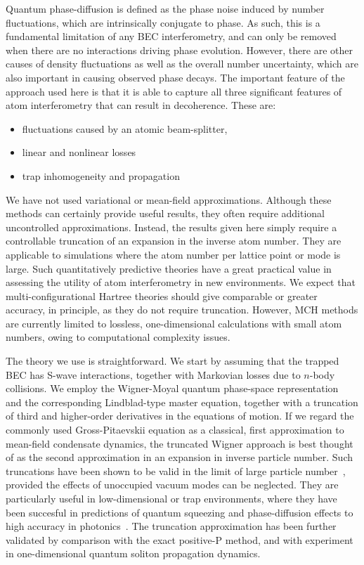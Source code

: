 \documentclass[aps,prl,twocolumn,showpacs,amsmath,amssymb,superscriptaddress]{revtex4-1}
\begin{document}
Quantum phase-diffusion is defined as the phase noise induced by number fluctuations,
which are intrinsically conjugate to phase.
As such, this is a fundamental limitation of any BEC interferometry,
and can only be removed when there are no interactions driving phase evolution.
However, there are other causes of density fluctuations as well as the overall number uncertainty,
which are also important in causing observed phase decays.
The important feature of the approach used here is that it is able to capture
all three significant features of atom interferometry that can result in decoherence.
These are:
\begin{itemize}
\item fluctuations caused by an atomic beam-splitter,
\item linear and nonlinear losses
\item trap inhomogeneity and propagation
\end{itemize}
We have not used variational or mean-field approximations.
Although these methods can certainly provide useful results,
they often require additional uncontrolled approximations.
Instead, the results given here simply require a controllable truncation
of an expansion in the inverse atom number.
They are applicable to simulations where the atom number per lattice point or mode is large.
Such quantitatively predictive theories have a great practical value
in assessing the utility of atom interferometry in new environments.
We expect that multi-configurational Hartree theories should give comparable or greater accuracy,
in principle, as they do not require truncation.
However, MCH methods are currently limited to lossless,
one-dimensional calculations with small atom numbers,
owing to computational complexity issues.

The theory we use is straightforward.
We start by assuming that the trapped BEC has S-wave interactions,
together with Markovian losses due to $n$-body collisions.
We employ the Wigner-Moyal quantum phase-space representation~\cite{Gardiner2004}
and the corresponding Lindblad-type master equation,
together with a truncation of third and higher-order derivatives in the equations of motion.
If we regard the commonly used Gross-Pitaevskii equation as a classical,
first approximation to mean-field condensate dynamics,
the truncated Wigner approach is best thought of as the second approximation
in an expansion in inverse particle number.
Such truncations have been shown to be valid in the limit of large particle number~\cite{Sinatra2002},
provided the effects of unoccupied vacuum modes can be neglected.
They are particularly useful in low-dimensional or trap environments,
where they have been succesful in predictions of quantum squeezing
and phase-diffusion effects to high accuracy in photonics~\cite{Corney2008}.
The truncation approximation has been further validated by comparison
with the exact positive-P method,
and with experiment in one-dimensional quantum soliton propagation dynamics.
\end{document}

